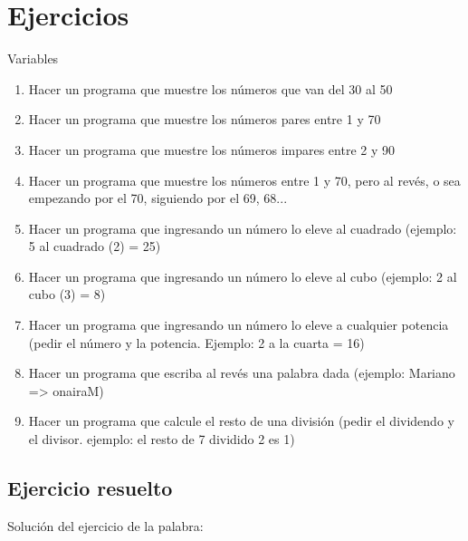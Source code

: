 \section{Ejercicios}
\begin{ejercicio}{Variables}{
\begin{enumerate}
  \item Hacer un programa que muestre los números que van del 30 al 50
  \item Hacer un programa que muestre los números pares entre 1 y 70
  \item Hacer un programa que muestre los números impares entre 2 y 90
  \item Hacer un programa que muestre los números entre 1 y 70, pero al revés, o sea empezando por el 70, siguiendo por el 69, 68...
  \item Hacer un programa que ingresando un número lo eleve al cuadrado (ejemplo: 5 al cuadrado (2) = 25)
  \item Hacer un programa que ingresando un número lo eleve al cubo (ejemplo: 2 al cubo (3) = 8)
  \item Hacer un programa que ingresando un número lo eleve a cualquier potencia (pedir el número y la  potencia. Ejemplo: 2 a la cuarta = 16)
  \item Hacer un programa que escriba al revés una palabra dada (ejemplo: Mariano => onairaM)
  \item Hacer un programa que calcule el resto de una división (pedir el dividendo y el divisor. ejemplo: el resto de 7 dividido 2 es 1)
  \end{enumerate} 
}
\end{ejercicio}

\subsection{Ejercicio resuelto}
Solución del ejercicio de la palabra:

